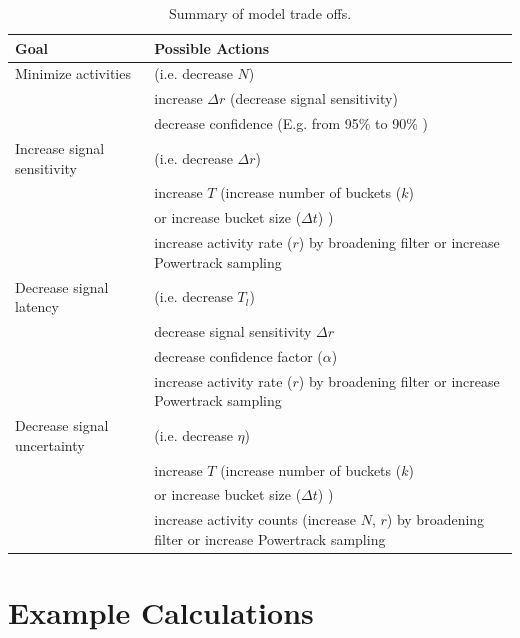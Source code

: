 \documentclass{article}
\begin{document}
\begin{table}[!h]
    \begin{tabular}{ p{4cm}| m{7cm}}
     \hline
Goal  & Possible Actions \\
\hline
Minimize activities  & (i.e. decrease $N$)  \\
                                  & increase $\Delta r$ (decrease signal sensitivity)  \\
                                  & decrease confidence (E.g. from 95\% to 90\% )  \\
\hline	
Increase signal sensitivity   & (i.e. decrease $\Delta r$)  \\
                                  & increase $T$ (increase number of buckets ($k$)  \\
                                  & or increase bucket size ($\Delta t$) )  \\
                                  & increase activity rate ($r$) by broadening filter or increase Powertrack sampling \\
\hline
Decrease signal latency      & (i.e. decrease $T_l$)  \\
                                 & decrease signal sensitivity $\Delta r$  \\
                                 & decrease confidence factor ($\alpha$) \\
                                 & increase activity rate ($r$) by broadening filter or increase Powertrack sampling \\
\hline
Decrease signal uncertainty & (i.e. decrease $\eta$) \\ %
                          	 & increase $T$ (increase number of buckets ($k$)  \\
                                 & or increase bucket size ($\Delta t$) )  \\
                                 & increase activity counts (increase $N$, $r$) by broadening filter or increase Powertrack sampling \\
\hline
\end{tabular}
\caption{Summary of model trade offs.}
\label{tab:tradeoff}

\end{table}

\section{Example Calculations} 
\end{document}

